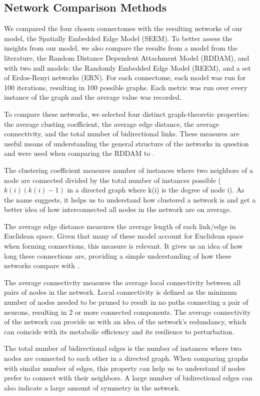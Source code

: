 \subsection{Network Comparison Methods}

We compared the four chosen \ce connectomes with the resulting networks of our model, the Spatially Embedded Edge Model (SEEM). 
To better assess the insights from our model, we also compare the results from a model from the literature, the Random Distance Dependent Attachment Model (RDDAM), and with two null models: the Randomly Embedded Edge Model (REEM), and a set of Erdos-Renyi networks (ERN).
For each connectome, each model was run for 100 iterations, resulting in 100 possible graphs. 
Each metric was run over every instance of the graph and the average value was recorded. 

To compare these networks, we selected four distinct graph-theoretic properties: the average clusting coefficient, the average edge distance, the average connectivity, and the total number of bidirectional links. 
These measures are useful means of understanding the general structure of the networks in question and were used when comparing the RDDAM to \ce \citep{Itzhack}.

The clustering coefficient measures number of instances where two neighbors of a node are connected divided by the total number of instances possible ($k(i)(k(i)-1)$ in a directed graph where k(i) is the degree of node i). 
As the name suggests, it helps us to understand how clustered a network is and get a better idea of how interconnected all nodes in the network are on average. 

The average edge distance measures the average length of each link/edge in Euclidean space. 
Given that many of these model account for Euclidean space when forming connections, this measure is relevant. 
It gives us an idea of how long these connections are, providing a simple understanding of how these networks compare with \ce. 

The average connectivity measures the average local connectivity between all pairs of nodes in the network.
Local connectivity is defined as the minimum number of nodes needed to be pruned to result in no paths connecting a pair of neurons, resulting in 2 or more connected components.
The average connectivity of the network can provide us with an idea of the network's redundancy, which can coincide with its
metabolic efficiency and its resilience to perturbation.

The total number of bidirectional edges is the number of instances where two nodes are connected to each other in a directed graph.
When comparing graphs with similar number of edges, this property can help us to understand if nodes prefer to connect with their neighbors.
A large number of bidirectional edges can also indicate a large amount of symmetry in the network.

